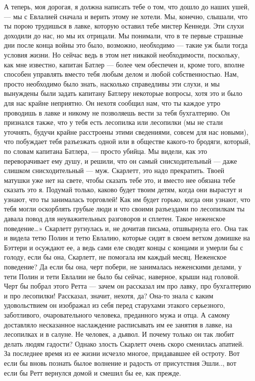 А теперь, моя дорогая, я должна написать тебе о том, что дошло до наших ушей, — мы с Евлалией сначала и верить этому не хотели. Мы, конечно, слышали, что ты порою трудишься в лавке, которую оставил тебе мистер Кеннеди. Эти слухи доходили до нас, но мы их отрицали. Мы понимали, что в те первые страшные дни после конца войны это было, возможно, необходимо — такие уж были тогда условия жизни. Но сейчас ведь в этом нет никакой необходимости, поскольку, как мне известно, капитан Батлер — более чем обеспечен и, кроме того, вполне способен управлять вместо тебя любым делом и любой собственностью. Нам, просто необходимо было знать, насколько справедливы эти слухи, и мы вынуждены были задать капитану Батлеру некоторые вопросы, хотя это и было для нас крайне неприятно.
Он нехотя сообщил нам, что ты каждое утро проводишь в лавке и никому не позволяешь вести за тебя бухгалтерию. Он признался также, что у тебя есть лесопилка или лесопилки (мы не стали уточнять, будучи крайне расстроены этими сведениями, совсем для нас новыми), что побуждает тебя разъезжать одной или в обществе какого-то бродяги, который, по словам капитана Батлера, — просто убийца. Мы видели, как это переворачивает ему душу, и решили, что он самый снисходительный — даже слишком снисходительный — муж. Скарлетт, это надо прекратить. Твоей матушки уже нет на свете, чтобы сказать тебе это, и вместо нее обязана тебе сказать это я. Подумай только, каково будет твоим детям, когда они вырастут и узнают, что ты занималась торговлей! Как им будет горько, когда они узнают, что тебя могли оскорблять грубые люди и что своими разъездами по лесопилкам ты давала повод для неуважительных разговоров и сплетен. Такое неженское поведение…» Скарлетт ругнулась и, не дочитав письма, отшвырнула его. Она так и видела тетю Полин и тетю Евлалию, которые сидят в своем ветхом домишке на Бэттери и осуждают ее, а ведь сами еле сводят концы с концами и умерли бы с голоду, если бы она, Скарлетт, не помогала им каждый месяц. Неженское поведение? Да если бы она, черт побери, не занималась неженскими делами, у тети Полин и тети Евлалии не было бы сейчас, наверное, крыши над головой. Черт бы побрал этого Ретта — зачем он рассказал им про лавку, про бухгалтерию и про лесопилки! Рассказал, значит, нехотя, да? Она-то знала с каким удовольствием он изображал из себя перед старухами этакого серьезного, заботливого, очаровательного человека, преданного мужа и отца. А самому доставляло несказанное наслаждение расписывать им ее занятия в лавке, на лесопилках и в салуне. Не человек, а дьявол. И почему только он так любит делать людям гадости?
Однако злость Скарлетт очень скоро сменилась апатией. За последнее время из ее жизни исчезло многое, придававшее ей остроту. Вот если бы вновь познать былое волнение и радость от присутствия Эшли.., вот если бы Ретт вернулся домой и смешил бы ее, как прежде.




